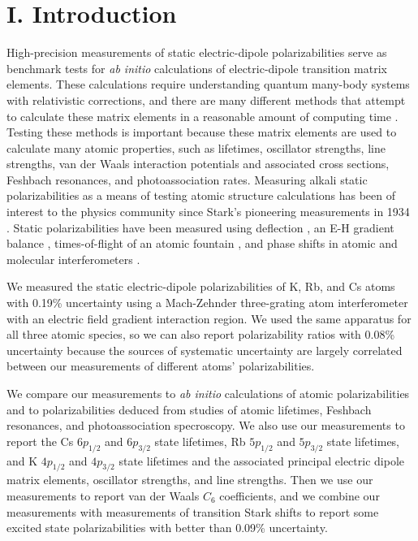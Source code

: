 \documentclass[twocolumn,prl,showpacs,superscriptaddress,longbibliography]{revtex4-1}   %
\begin{document}
\maketitle



\section{I. Introduction}

High-precision measurements of static electric-dipole polarizabilities serve as benchmark tests for \textit{ab initio} calculations of electric-dipole transition matrix elements. 
These calculations require understanding quantum many-body systems with relativistic corrections, and there are many different methods that attempt to calculate these matrix elements in a reasonable amount of computing time \cite{Mitroy2010}. Testing these methods is important because these matrix elements are used to calculate many atomic properties, such as lifetimes, oscillator strengths, line strengths, van der Waals interaction potentials and associated cross sections, Feshbach resonances, and photoassociation rates.
Measuring alkali static polarizabilities as a means of testing atomic 
structure calculations has been of interest to the physics community since
Stark's pioneering measurements in 1934 \cite{Scheffers1934}. Static polarizabilities have been measured using deflection \cite{Scheffers1934,Chamberlain1963,Hall1974,Ma2015}, an E-H gradient
balance \cite{Salop1961,Molof1974a}, times-of-flight of an atomic fountain \cite{Amini2003}, and phase shifts in atomic and molecular interferometers
\cite{Ekstrom1995,Miffre2006,Holmgren2010,Berninger2007}.

We measured the static electric-dipole polarizabilities of K, Rb, and Cs atoms with 0.19\% uncertainty using a Mach-Zehnder three-grating atom interferometer \cite{Berman1997,Cronin2009} with an electric field gradient interaction region. We used the same apparatus for all three atomic species, so we can also report polarizability ratios with 0.08\% uncertainty because the sources of systematic uncertainty are largely correlated between our measurements of different atoms' polarizabilities. 

We compare our measurements to
\textit{ab initio} calculations of atomic polarizabilities and to polarizabilities deduced from studies of atomic lifetimes, Feshbach resonances, and photoassociation specroscopy. We also use our measurements to report the Cs $6p_{1/2}$ and $6p_{3/2}$ state lifetimes, Rb $5p_{1/2}$ and $5p_{3/2}$ state lifetimes, and K $4p_{1/2}$ and $4p_{3/2}$ state lifetimes and the associated principal electric dipole matrix elements, oscillator strengths, and line strengths. 
Then we use our measurements to report van der Waals $C_6$ coefficients,
and we combine our measurements with measurements of 
transition Stark shifts to report some excited state polarizabilities with better than 0.09\% uncertainty.
\end{document}
